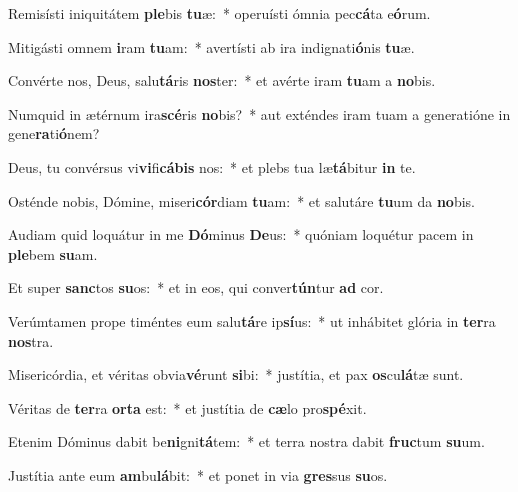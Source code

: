 \item Remisísti iniquitátem \textbf{ple}bis \textbf{tu}æ:~* operuísti ómnia pec\textbf{cá}ta e\textbf{ó}rum.
\item Mitigásti omnem \textbf{i}ram \textbf{tu}am:~* avertísti ab ira indignati\textbf{ó}nis \textbf{tu}æ.
\item Convérte nos, Deus, salu\textbf{tá}ris \textbf{nos}ter:~* et avérte iram \textbf{tu}am a \textbf{no}bis.
\item Numquid in ætérnum ira\textbf{scé}ris \textbf{no}bis?~* aut exténdes iram tuam a generatióne in gene\textbf{ra}ti\textbf{ó}nem?
\item Deus, tu convérsus vi\textbf{vi}fi\textbf{cá}\textbf{bis} nos:~* et plebs tua læ\textbf{tá}bitur \textbf{in} te.
\item Osténde nobis, Dómine, miseri\textbf{cór}diam \textbf{tu}am:~* et salutáre \textbf{tu}um da \textbf{no}bis.
\item Audiam quid loquátur in me \textbf{Dó}minus \textbf{De}us:~* quóniam loquétur pacem in \textbf{ple}bem \textbf{su}am.
\item Et super \textbf{sanc}tos \textbf{su}os:~* et in eos, qui conver\textbf{tún}tur \textbf{ad} cor.
\item Verúmtamen prope timéntes eum salu\textbf{tá}re ip\textbf{sí}us:~* ut inhábitet glória in \textbf{ter}ra \textbf{nos}tra.
\item Misericórdia, et véritas obvia\textbf{vé}runt \textbf{si}bi:~* justítia, et pax \textbf{os}cu\textbf{lá}tæ sunt.
\item Véritas de \textbf{ter}ra \textbf{or}\textbf{ta} est:~* et justítia de \textbf{cæ}lo pro\textbf{spé}xit.
\item Etenim Dóminus dabit be\textbf{ni}gni\textbf{tá}tem:~* et terra nostra dabit \textbf{fruc}tum \textbf{su}um.
\item Justítia ante eum \textbf{am}bu\textbf{lá}bit:~* et ponet in via \textbf{gres}sus \textbf{su}os.
